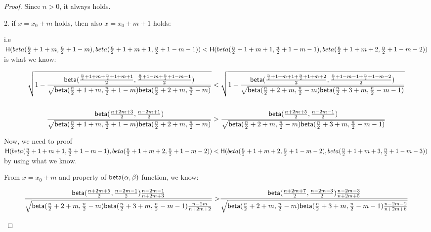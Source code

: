 \begin{proof}
Since $n > 0$, it always holds.

2. if $x = x_0 + m$ holds, then also $x = x_0 + m + 1$ holds:

i.e $\mathsf{H}(beta(\frac{n}{2} + 1 + m, \frac{n}{2} + 1 - m), beta(\frac{n}{2} + 1 + m + 1, \frac{n}{2} + 1 - m - 1)) 
< \mathsf{H}(beta(\frac{n}{2} + 1 + m + 1, \frac{n}{2} + 1 - m - 1), beta(\frac{n}{2} + 1 + m + 2, \frac{n}{2} + 1 - m - 2))$
is what we know:

\begin{small}
\begin{equation*}
\begin{split}
\sqrt{
1 - \frac{\mathsf{beta}(
\frac{\frac{n}{2} + 1 + m + \frac{n}{2} + 1 + m + 1}{2},
\frac{\frac{n}{2} + 1 - m + \frac{n}{2} + 1 - m - 1}{2})}
{\sqrt{
\mathsf{beta}(\frac{n}{2} + 1 + m, \frac{n}{2} + 1 - m)
\mathsf{beta}(\frac{n}{2} + 2 + m, \frac{n}{2} - m)
}
}
}
& < \sqrt{
1 - \frac{\mathsf{beta}(
\frac{\frac{n}{2} + 1 + m + 1 + \frac{n}{2} + 1 + m + 2}{2},
\frac{\frac{n}{2} + 1 - m - 1 + \frac{n}{2} + 1 - m - 2}{2})}
{\sqrt{
\mathsf{beta}(\frac{n}{2} + 2 + m, \frac{n}{2} - m)
\mathsf{beta}(\frac{n}{2} + 3 + m, \frac{n}{2} - m - 1)
}
}
}\\
\\
\frac{\mathsf{beta}(\frac{n + 2m + 3}{2}, \frac{n - 2m + 1}{2})}
{\sqrt{
\mathsf{beta}(\frac{n}{2} + 1 + m, \frac{n}{2} + 1 - m)
\mathsf{beta}(\frac{n}{2} + 2 + m, \frac{n}{2} - m)
}
}
& > \frac{\mathsf{beta}(\frac{n + 2m + 5}{2}, \frac{n - 2m - 1}{2})}
{\sqrt{
\mathsf{beta}(\frac{n}{2} + 2 + m, \frac{n}{2} - m)
\mathsf{beta}(\frac{n}{2} + 3 + m, \frac{n}{2} - m - 1)
}
}
\end{split}
\end{equation*}
\end{small}

Now, we need to proof $\mathsf{H}(beta(\frac{n}{2} + 1 + m + 1, \frac{n}{2} + 1 - m - 1), beta(\frac{n}{2} + 1 + m + 2, \frac{n}{2} + 1 - m - 2)) 
< \mathsf{H}(beta(\frac{n}{2} + 1 + m + 2, \frac{n}{2} + 1 - m - 2), beta(\frac{n}{2} + 1 + m + 3, \frac{n}{2} + 1 - m - 3))$ by using what we know.


From $x = x_0 + m$ and property of $\mathsf{beta}(\alpha, \beta)$ function, we know:

\begin{small}
\begin{equation*}
\begin{split}
 \frac{\mathsf{beta}(\frac{n + 2m + 5}{2}, \frac{n - 2m - 1}{2})
\frac{n - 2m - 1}{n + 2m + 3}}
{\sqrt{
\mathsf{beta}(\frac{n}{2} + 2 + m, \frac{n}{2} - m)
\mathsf{beta}(\frac{n}{2} + 3 + m, \frac{n}{2} - m - 1)
\frac{n - 2m}{n + 2m + 2}
}
}
> & \frac{\mathsf{beta}(\frac{n + 2m + 7}{2}, \frac{n - 2m - 3}{2})
\frac{n - 2m - 3}{n + 2m + 5}}
{\sqrt{
\mathsf{beta}(\frac{n}{2} + 2 + m, \frac{n}{2} - m)
\mathsf{beta}(\frac{n}{2} + 3 + m, \frac{n}{2} - m - 1)
\frac{n - 2m - 2}{n + 2m + 6}
}
}\\
\end{split}
\end{equation*}


\end{small}
\end{proof}
